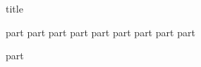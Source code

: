 \documentclass[paper=216.35mm:303.35mm,pagesize=pdftex,final,headinclude=false,footinclude=false,twoside,egregdoesnotlikesansseriftitles]{kaobook}
\begin{document}
{title}
\mainmatter

{part}
{part}
{part}
{part}
{part}
{part}
{part}
{part}
{part}


\backmatter
{part}
\end{document}
